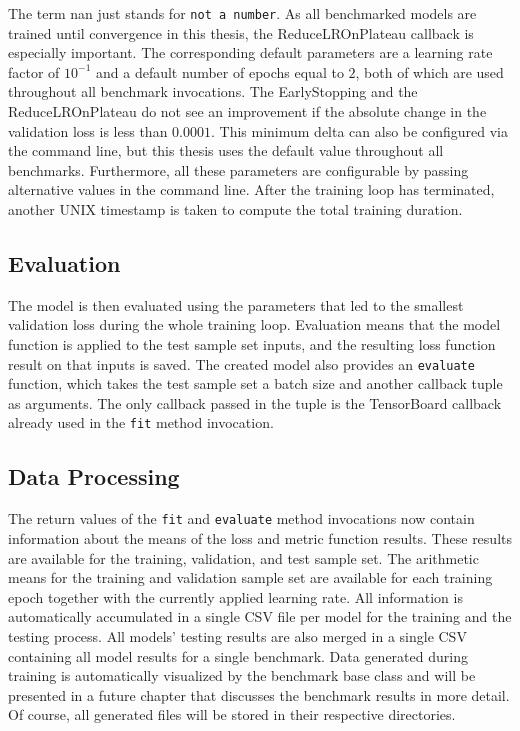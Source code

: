 \documentclass[draft,final]{vutinfth} %
\begin{document}
    The term nan just stands for \texttt{not a number}.
    As all benchmarked models are trained until convergence in this thesis, the ReduceLROnPlateau callback is especially important.
    The corresponding default parameters are a learning rate factor of $10^{-1}$ and a default number of epochs equal to $2$, both of which are used throughout all benchmark invocations.
    The EarlyStopping and the ReduceLROnPlateau do not see an improvement if the absolute change in the validation loss is less than $0.0001$.
    This minimum delta can also be configured via the command line, but this thesis uses the default value throughout all benchmarks.
    Furthermore, all these parameters are configurable by passing alternative values in the command line.
    After the training loop has terminated, another UNIX timestamp is taken to compute the total training duration.

    \subsection{Evaluation}
    The model is then evaluated using the parameters that led to the smallest validation loss during the whole training loop.
    Evaluation means that the model function is applied to the test sample set inputs, and the resulting loss function result on that inputs is saved.
    The created model also provides an \texttt{evaluate} function, which takes the test sample set a batch size and another callback tuple as arguments.
    The only callback passed in the tuple is the TensorBoard callback already used in the \texttt{fit} method invocation.

    \subsection{Data Processing}
    The return values of the \texttt{fit} and \texttt{evaluate} method invocations now contain information about the means of the loss and metric function results. These results are available for the training, validation, and test sample set.
    The arithmetic means for the training and validation sample set are available for each training epoch together with the currently applied learning rate.
    All information is automatically accumulated in a single CSV file per model for the training and the testing process.
    All models' testing results are also merged in a single CSV containing all model results for a single benchmark.
    Data generated during training is automatically visualized by the benchmark base class and will be presented in a future chapter that discusses the benchmark results in more detail.
    Of course, all generated files will be stored in their respective directories.
\end{document}
